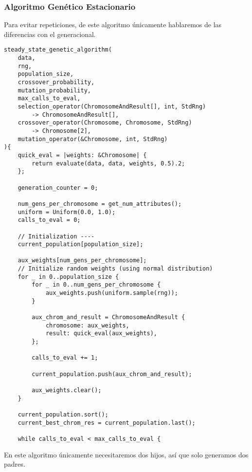 \documentclass[size=a4, parskip=half, titlepage=false, toc=flat, toc=bib, 12pt]{scrartcl}
\begin{document}
\subsubsection{Algoritmo Genético Estacionario}
Para evitar repeticiones, de este algoritmo únicamente hablaremos de las diferencias con el generacional.
\begin{verbatim}
steady_state_genetic_algorithm(
    data,
    rng,
    population_size,
    crossover_probability,
    mutation_probability,
    max_calls_to_eval,
    selection_operator(ChromosomeAndResult[], int, StdRng)
        -> ChromosomeAndResult[],
    crossover_operator(Chromosome, Chromosome, StdRng)
        -> Chromosome[2],
    mutation_operator(&Chromosome, int, StdRng)
){
    quick_eval = |weights: &Chromosome| {
        return evaluate(data, data, weights, 0.5).2;
    };

    generation_counter = 0;

    num_gens_per_chromosome = get_num_attributes();
    uniform = Uniform(0.0, 1.0);
    calls_to_eval = 0;

    // Initialization ----
    current_population[population_size];

    aux_weights[num_gens_per_chromosome];
    // Initialize random weights (using normal distribution)
    for _ in 0..population_size {
        for _ in 0..num_gens_per_chromosome {
            aux_weights.push(uniform.sample(rng));
        }

        aux_chrom_and_result = ChromosomeAndResult {
            chromosome: aux_weights,
            result: quick_eval(aux_weights),
        };

        calls_to_eval += 1;

        current_population.push(aux_chrom_and_result);

        aux_weights.clear();
    }

    current_population.sort();
    current_best_chrom_res = current_population.last();

    while calls_to_eval < max_calls_to_eval {
\end{verbatim}
En este algoritmo únicamente necesitaremos dos hijos, así que solo generamos dos padres.
\end{document}
